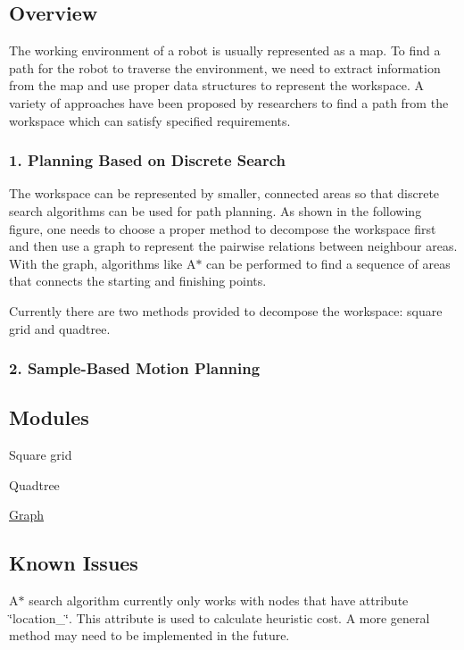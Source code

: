 \subsection*{Overview}

The working environment of a robot is usually represented as a map. To find a path for the robot to traverse the environment, we need to extract information from the map and use proper data structures to represent the workspace. A variety of approaches have been proposed by researchers to find a path from the workspace which can satisfy specified requirements.

\subsubsection*{1. Planning Based on Discrete Search}

The workspace can be represented by smaller, connected areas so that discrete search algorithms can be used for path planning. As shown in the following figure, one needs to choose a proper method to decompose the workspace first and then use a graph to represent the pairwise relations between neighbour areas. With the graph, algorithms like A$\ast$ can be performed to find a sequence of areas that connects the starting and finishing points.

 Currently there are two methods provided to decompose the workspace\-: square grid and quadtree.

\subsubsection*{2. Sample-\/\-Based Motion Planning}

\subsection*{Modules}


\begin{DoxyItemize}
\item Square grid
\item Quadtree
\item \hyperlink{graph}{Graph}
\end{DoxyItemize}

\subsection*{Known Issues}


\begin{DoxyItemize}
\item A$\ast$ search algorithm currently only works with nodes that have attribute \char`\"{}location\-\_\-\char`\"{}. This attribute is used to calculate heuristic cost. A more general method may need to be implemented in the future. 
\end{DoxyItemize}